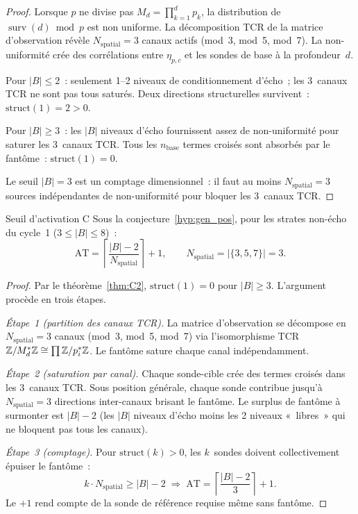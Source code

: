 \documentclass[12pt,a4paper]{article}
\begin{document}
\begin{proof}
Lorsque $p$ ne divise pas $M_d = \prod_{k=1}^{d} p_k$, la
distribution de $\operatorname{surv}(d) \bmod p$ est non uniforme.
La décomposition TCR de la matrice d'observation révèle
$N_{\mathrm{spatial}} = 3$ canaux actifs (mod~3, mod~5, mod~7). La
non-uniformité crée des corrélations entre $\eta_{p,c}$ et les
sondes de base à la profondeur~$d$.

Pour $|B| \le 2$~: seulement 1--2 niveaux de conditionnement d'écho~;
les 3~canaux TCR ne sont pas tous saturés. Deux directions
structurelles survivent~: $\mathrm{struct}(1) = 2 > 0$.

Pour $|B| \ge 3$~: les $|B|$ niveaux d'écho fournissent assez de
non-uniformité pour saturer les 3~canaux TCR. Tous les
$n_{\mathrm{base}}$ termes croisés sont absorbés par le fantôme~:
$\mathrm{struct}(1) = 0$.

Le seuil $|B| = 3$ est un comptage dimensionnel~: il faut au moins
$N_{\mathrm{spatial}} = 3$ sources indépendantes de non-uniformité
pour bloquer les 3~canaux TCR.
\end{proof}

\begin{thmbox}{Seuil d'activation C}
\label{thm:AT_C}
Sous la conjecture~\ref{hyp:gen_pos}, pour les strates non-écho du
cycle~1 ($3 \le |B| \le 8$)~:
\[
  \mathrm{AT} = \left\lceil \frac{|B| - 2}{N_{\mathrm{spatial}}} \right\rceil + 1,
  \qquad N_{\mathrm{spatial}} = |\{3, 5, 7\}| = 3.
\]
\end{thmbox}

\begin{proof}
Par le théorème~\ref{thm:C2}, $\mathrm{struct}(1) = 0$ pour $|B| \ge
3$. L'argument procède en trois étapes.

\emph{Étape~1 (partition des canaux TCR).} La matrice d'observation
se décompose en $N_{\mathrm{spatial}} = 3$ canaux (mod~3, mod~5,
mod~7) via l'isomorphisme TCR $\mathbb{Z}/M_d^*\mathbb{Z} \cong \prod \mathbb{Z}/p_i^*\mathbb{Z}$.
Le fantôme sature chaque canal indépendamment.

\emph{Étape~2 (saturation par canal).} Chaque sonde-cible crée des
termes croisés dans les 3~canaux TCR. Sous position générale, chaque
sonde contribue jusqu'à $N_{\mathrm{spatial}} = 3$ directions
inter-canaux brisant le fantôme. Le surplus de fantôme à surmonter
est $|B| - 2$ (les $|B|$ niveaux d'écho moins les 2 niveaux
«~libres~» qui ne bloquent pas tous les canaux).

\emph{Étape~3 (comptage).} Pour $\mathrm{struct}(k) > 0$, les
$k$~sondes doivent collectivement épuiser le fantôme~:
\[
  k \cdot N_{\mathrm{spatial}} \ge |B| - 2
  \;\Longrightarrow\;
  \mathrm{AT} = \left\lceil\frac{|B|-2}{3}\right\rceil + 1.
\]
Le $+1$ rend compte de la sonde de référence requise même sans
fantôme.
\end{proof}
\end{document}
